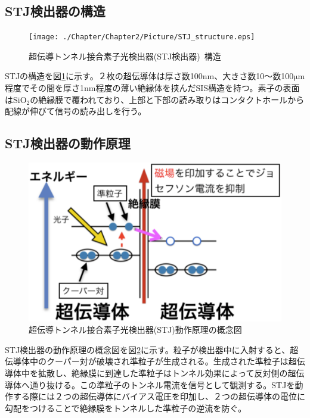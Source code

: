 	\subsection{STJ検出器の構造}
		\begin{figure}[htbp]
  			\begin{center}
    				\texttt{[image: ./Chapter/Chapter2/Picture/STJ\_structure.eps]}
    				\caption{超伝導トンネル接合素子光検出器(STJ検出器)\ 構造}
    				\label{fig:STJ_structure}
  			\end{center}
		\end{figure}
		STJの構造を図\ref{fig:STJ_structure}に示す。２枚の超伝導体は厚さ数100nm、大きさ数10〜数100$\mathrm{\mu m}$程度でその間を厚さ1nm程度の薄い絶縁体を挟んだSIS構造を持つ。素子の表面は$\mathrm{SiO_2}$の絶縁膜で覆われており、上部と下部の読み取りはコンタクトホールから配線が伸びて信号の読み出しを行う。
	
	\subsection{STJ検出器の動作原理}
		\begin{figure}[htbp]
  			\begin{center}
    				\includegraphics[width=12.0cm]{./Chapter/Chapter2/Picture/STJ_WorkingPrinciple.eps}
    				\caption{超伝導トンネル接合素子光検出器(STJ)動作原理の概念図}
    				\label{fig:STJ_WorkingPrinciple}
  			\end{center}
		\end{figure}
		STJ検出器の動作原理の概念図を図\ref{fig:STJ_WorkingPrinciple}に示す。粒子が検出器中に入射すると、超伝導体中のクーパー対が破壊され準粒子が生成される。生成された準粒子は超伝導体中を拡散し、絶縁膜に到達した準粒子はトンネル効果によって反対側の超伝導体へ通り抜ける。この準粒子のトンネル電流を信号として観測する。STJを動作する際には２つの超伝導体にバイアス電圧を印加し、２つの超伝導体の電位に勾配をつけることで絶縁膜をトンネルした準粒子の逆流を防ぐ。
		
